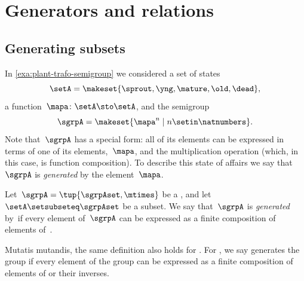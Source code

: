 
\section{Generators and relations}



\subsection{Generating subsets}

In \cref{exa:plant-trafo-semigroup} we considered a set of states
%
\begin{equation}
    \setA= \makeset{ \sprout, \yng, \mature, \old, \dead },
\end{equation}
%
a function~$\mapa \colon \setA \sto \setA$, and the semigroup
%
\begin{equation}
    \label{eq:trafo-sgrp-one-gen}
    \sgrpA = \makeset{ \mapa^n \mid n \setin \natnumbers }.
\end{equation}
%
Note that~$\sgrpA$ has a special form: all of its elements can be expressed in terms of one of its elements,~$\mapa$, and the multiplication operation (which, in this case, is function composition).
To describe this state of affairs we say that~$\sgrpA$ is \emph{generated} by the element~$\mapa$.

\begin{ctdefinition}
    \label{def:gen-semigrp}
    Let~$\sgrpA = \tup{\sgrpAset, \mtimes}$ be a , and let~$\setA \setsubseteq \sgrpAset$ be a subset.
    We say that~$\sgrpA$ is \emph{generated} by~\setA if every element of~$\sgrpA$ can be expressed as a finite composition of elements of~\setA.
\end{ctdefinition}

\begin{remark}
    Mutatis mutandis, the same definition also holds for .
    For , we say \setA generates the group if every element of the group can be expressed as a finite composition of elements of \setA or their inverses.
\end{remark}

